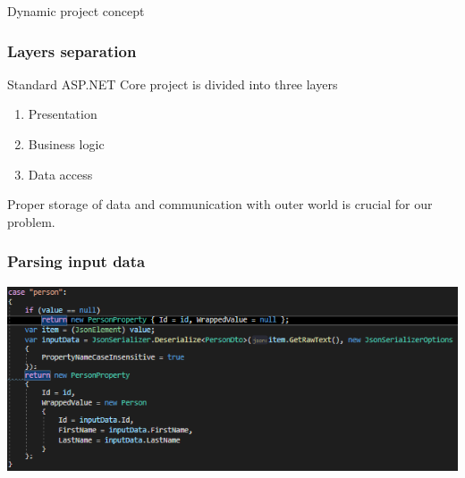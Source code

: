 \documentclass{beamer}
\begin{document}
\begin{section}{Dynamic project concept}
\begin{frame}
\end{frame}

\begin{frame}
\frametitle{Layers separation} 
Standard ASP.NET Core project is divided into three layers \pause
\begin{enumerate}
	\item Presentation \pause
	\item Business logic \pause
	\item Data access \pause
\end{enumerate}

Proper storage of data and communication with outer world is crucial for our problem.
\end{frame}

\begin{frame}
\frametitle{Parsing input data}


 \includegraphics{personParsing.png}

\end{frame}


\end{section}
\end{document}
